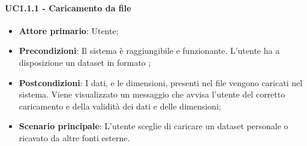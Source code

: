 \paragraph{UC1.1.1 - Caricamento da file}
\begin{itemize}
	\item \textbf{Attore primario}: Utente;
	\item \textbf{Precondizioni}: Il sistema è raggiungibile e funzionante. L'utente ha a disposizione un dataset in formato ;
	\item \textbf{Postcondizioni}: I dati, e le dimensioni, presenti nel file vengono caricati nel sistema. Viene visualizzato un messaggio che avvisa l'utente del corretto caricamento e della validità dei dati e delle dimensioni;
	\item \textbf{Scenario principale}: L'utente sceglie di caricare un dataset personale o ricavato da altre fonti esterne.
	
\end{itemize}

\newpage